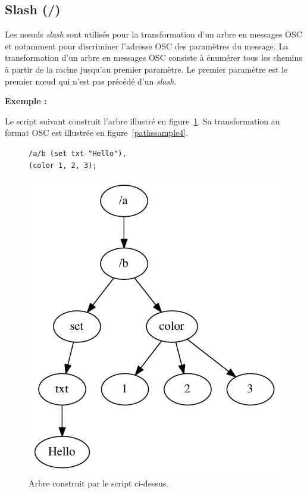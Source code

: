 \documentclass{article}
\newcommand{\exemple}	{\vspace*{1mm}\hspace*{-4mm}\textbf{Exemple :}}
\newcommand{\code}	[2][0.9]		{\vspace{0mm}\begin{center}\colorbox{mygrey}{
							\begin{minipage}[t]{#1\columnwidth} 
							{\small \texttt{#2}}
							\end{minipage}}\end{center}}
\newcommand{\uld}		{\hspace*{9mm}}
\begin{document}
\subsection{Slash (/)}\label{ssec:slash}

Les nœuds \emph{slash} sont utilisés pour la transformation d'un arbre en messages OSC et notamment pour discriminer l'adresse OSC des paramètres du message. La transformation d'un arbre en messages OSC consiste à énumérer tous les chemins à partir de la racine jusqu'au premier paramètre. Le premier paramètre est le premier nœud qui n'est pas précédé d'un \emph{slash}.

\exemple

Le script suivant construit l'arbre illustré en figure~\ref{evalsample4}. Sa transformation au format OSC est illustrée en figure~\ref{pathssample4}.
\begin{figure}[htbp]
\code{/a/b (set txt "Hello"),\\
\uld	 (color 1, 2, 3);
}
\begin{center}
\includegraphics[width=0.6\columnwidth]{eval/sample4}
\caption{Arbre construit par le script ci-dessus.}
\label{evalsample4}
\end{center}
\end{figure}
\end{document}
